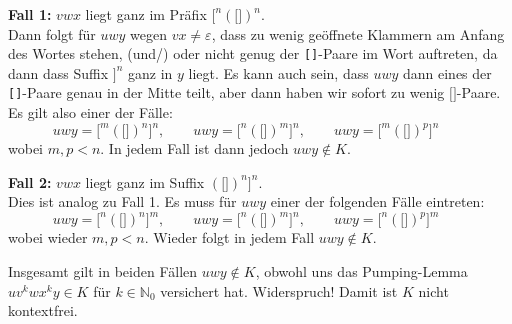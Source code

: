 \documentclass[a4paper,graphics,11pt]{article}
\begin{document}
\textbf{Fall 1:} $vwx$ liegt ganz im Präfix $\texttt{[}^n(\texttt{[]})^n$.\\
Dann folgt für $uwy$ wegen $vx \neq \varepsilon$, dass zu wenig geöffnete Klammern am Anfang des Wortes stehen,
(und/) oder nicht genug der \texttt{[]}-Paare im Wort auftreten, da dann dass Suffix $\texttt{]}^n$ ganz in $y$ liegt.
Es kann auch sein, dass $uwy$ dann eines der \texttt{[]}-Paare genau in der Mitte teilt, aber dann haben wir
sofort zu wenig $\texttt{[]}$-Paare.
Es gilt also einer der Fälle:
$$
    uwy = \texttt{[}^m(\texttt{[]})^n\texttt{]}^n,\qquad
    uwy = \texttt{[}^n(\texttt{[]})^m\texttt{]}^n,\qquad
    uwy = \texttt{[}^m(\texttt{[]})^p\texttt{]}^n\qquad
$$
wobei $m,p < n$. In jedem Fall ist dann jedoch $uwy \notin K$.

\textbf{Fall 2:} $vwx$ liegt ganz im Suffix $(\texttt{[]})^n\texttt{]}^n$.\\
Dies ist analog zu Fall 1. Es muss für $uwy$ einer der folgenden Fälle eintreten:
$$
    uwy = \texttt{[}^n(\texttt{[]})^n\texttt{]}^m,\qquad
    uwy = \texttt{[}^n(\texttt{[]})^m\texttt{]}^n,\qquad
    uwy = \texttt{[}^n(\texttt{[]})^p\texttt{]}^m\qquad
$$
wobei wieder $m,p < n$. Wieder folgt in jedem Fall $uwy \notin K$.

Insgesamt gilt in beiden Fällen $uwy \notin K$, obwohl uns das Pumping-Lemma $uv^kwx^ky \in K$ für $k \in \mathbb{N}_0$
versichert hat. Widerspruch! Damit ist $K$ nicht kontextfrei.
\end{document}
